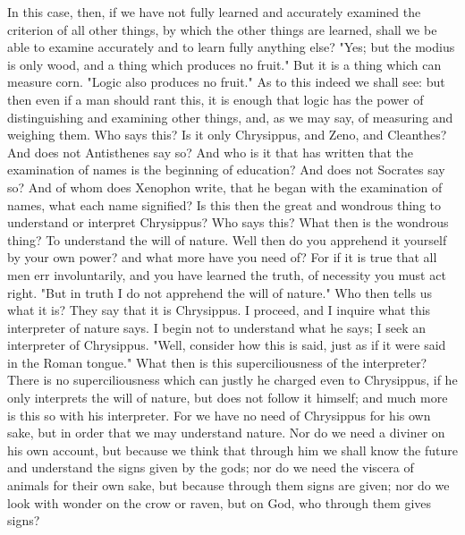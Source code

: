 \documentclass[a4paper]{article}
\begin{document}
In this case, then, if we have not fully learned and accurately examined
the criterion of all other things, by which the other things are learned,
shall we be able to examine accurately and to learn fully anything
else? "Yes; but the modius is only wood, and a thing which produces
no fruit." But it is a thing which can measure corn. "Logic also produces
no fruit." As to this indeed we shall see: but then even if a man
should rant this, it is enough that logic has the power of distinguishing
and examining other things, and, as we may say, of measuring and weighing
them. Who says this? Is it only Chrysippus, and Zeno, and Cleanthes?
And does not Antisthenes say so? And who is it that has written that
the examination of names is the beginning of education? And does not
Socrates say so? And of whom does Xenophon write, that he began with
the examination of names, what each name signified? Is this then the
great and wondrous thing to understand or interpret Chrysippus? Who
says this? What then is the wondrous thing? To understand the will
of nature. Well then do you apprehend it yourself by your own power?
and what more have you need of? For if it is true that all men err
involuntarily, and you have learned the truth, of necessity you must
act right. "But in truth I do not apprehend the will of nature." Who
then tells us what it is? They say that it is Chrysippus. I proceed,
and I inquire what this interpreter of nature says. I begin not to
understand what he says; I seek an interpreter of Chrysippus. "Well,
consider how this is said, just as if it were said in the Roman tongue."
What then is this superciliousness of the interpreter? There is no
superciliousness which can justly he charged even to Chrysippus, if
he only interprets the will of nature, but does not follow it himself;
and much more is this so with his interpreter. For we have no need
of Chrysippus for his own sake, but in order that we may understand
nature. Nor do we need a diviner on his own account, but because we
think that through him we shall know the future and understand the
signs given by the gods; nor do we need the viscera of animals for
their own sake, but because through them signs are given; nor do we
look with wonder on the crow or raven, but on God, who through them
gives signs? 
\end{document}
